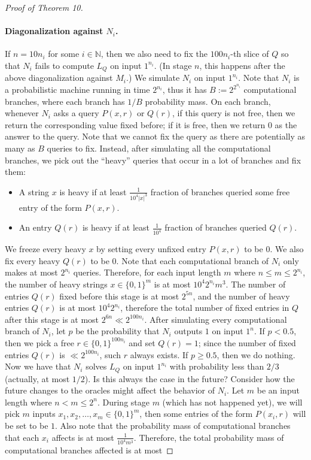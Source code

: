 \begin{proof}[Proof of Theorem 10]
\paragraph{Diagonalization against $N_i$.}
If $n=10n_i$ for some $i\in\mathbb N$, then we also need to fix the $100n_i$-th slice of $Q$ so that $N_i$ fails to compute $L_Q$ on input $1^{n_i}$. (In stage $n$, this happens after the above diagonalization against $M_i$.) We simulate $N_i$ on input $1^{n_i}$. Note that $N_i$ is a probabilistic machine running in time $2^{n_i}$, thus it has $B:=2^{2^{n_i}}$ computational branches, where each branch has $1/B$ probability mass. On each branch, whenever $N_i$ asks a query $P(x,r)$ or $Q(r)$, if this query is not free, then we return the corresponding value fixed before; if it is free, then we return $0$ as the answer to the query. Note that we cannot fix the query as there are potentially as many as $B$ queries to fix. Instead, after simulating all the computational branches, we pick out the ``heavy'' queries that occur in a lot of branches and fix them:
\begin{itemize}
\item A string $x$ is heavy if at least $\frac{1}{10^4|x|^3}$ fraction of branches queried some free entry of the form $P(x,r)$.
\item An entry $Q(r)$ is heavy if at least $\frac{1}{10^4}$ fraction of branches queried $Q(r)$.
\end{itemize}
We freeze every heavy $x$ by setting every unfixed entry $P(x,r)$ to be $0$. We also fix every heavy $Q(r)$ to be $0$. Note that each computational branch of $N_i$ only makes at most $2^{n_i}$ queries. Therefore, for each input length $m$ where $n\leq m\leq2^{n_i}$, the number of heavy strings $x\in\{0,1\}^m$ is at most $10^4 2^{n_i}m^3$. The number of entries $Q(r)$ fixed before this stage is at most $2^{5n}$, and the number of heavy entries $Q(r)$ is at most $10^4 2^{n_i}$, therefore the total number of fixed entries in $Q$ after this stage is at most $2^{6n}\ll2^{100n_i}$.
After simulating every computational branch of $N_i$, let $p$ be the probability that $N_i$ outputs $1$ on input $1^n$. If $p<0.5$, then we pick a free $r\in\{0,1\}^{100n_i}$ and set $Q(r)=1$; since the number of fixed entries $Q(r)$ is $\ll2^{100n_i}$, such $r$ always exists. If $p\geq0.5$, then we do nothing.
Now we have that $N_i$ solves $L_Q$ on input $1^{n_i}$ with probability less than $2/3$ (actually, at most $1/2$). Is this always the case in the future? Consider how the future changes to the oracles might affect the behavior of $N_i$. Let $m$ be an input length where $n<m\leq2^n$. During stage $m$ (which has not happened yet), we will pick $m$ inputs $x_1,x_2,\ldots,x_m\in\{0,1\}^m$, then some entries of the form $P(x_i,r)$ will be set to be $1$. Also note that the probability mass of computational branches that each $x_i$ affects is at most $\frac{1}{10^4m^3}$. Therefore, the total probability mass of computational branches affected is at most

\end{proof}
